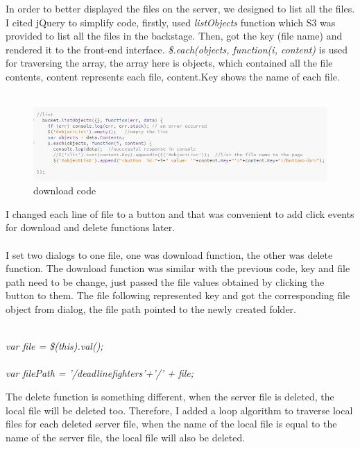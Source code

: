 \documentclass[a4paper]{article}
\begin{document}
{In order to better displayed the files on the server, we designed to list all the files. I cited jQuery to simplify code, firstly, used \emph{listObjects} function which S3 was provided to list all the files in the backstage. Then, got the key (file name) and rendered it to the front-end interface. \emph{\$.each(objects, function(i, content)} is used for traversing the array, the array here is objects, which contained all the file contents, content represents each file, content.Key shows the name of each file.\\\\

\begin{figure}[h!]
\centering
\includegraphics[scale=1.2]{code2}
\caption{download code}
\label{fig:code2}
\end{figure}

I changed each line of file to a button and that was convenient to add click events for download and delete functions later.\\\\
I set two dialogs to one file, one was download function, the other was delete function. The download function was similar with the previous code, key and file path need to be change, just passed the file values obtained by clicking the button to them. The file following represented key and got the corresponding file object from dialog, the file path pointed to the newly created folder.\\\\

\begin{center}
\emph{var file = \$(this).val();}\\\\
\emph{var filePath = '/deadlinefighters'+'/' + file;}
\end{center}

The delete function is something different, when the server file is deleted, the local file will be deleted too. Therefore, I added a loop algorithm to traverse local files for each deleted server file, when the name of the local file is equal to the name of the server file, the local file will also be deleted.

}
\end{document}
